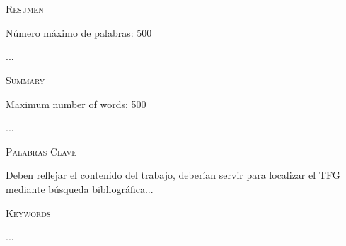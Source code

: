 \chapter*{}
\Large{\textsc{\textcolor{nar}{Resumen}}} \par
\vspace{0.2cm}
\normalsize{Número máximo de palabras: 500

...}

\vspace{0.9cm}

\Large{\textsc{\textcolor{nar}{Summary}}} \par
\vspace{0.2cm}
\normalsize{Maximum number of words: 500

...}
\vspace{0.9cm}

\Large{\textsc{\textcolor{nar}{Palabras Clave}}} \par \par
\vspace{0.2cm}
\normalsize{Deben reflejar el contenido del trabajo, deberían servir para localizar el TFG mediante búsqueda bibliográfica...} \par
\vspace{0.8cm}

\Large{\textsc{\textcolor{nar}{Keywords}}} \par
\vspace{0.2cm}
\normalsize{...} \par
